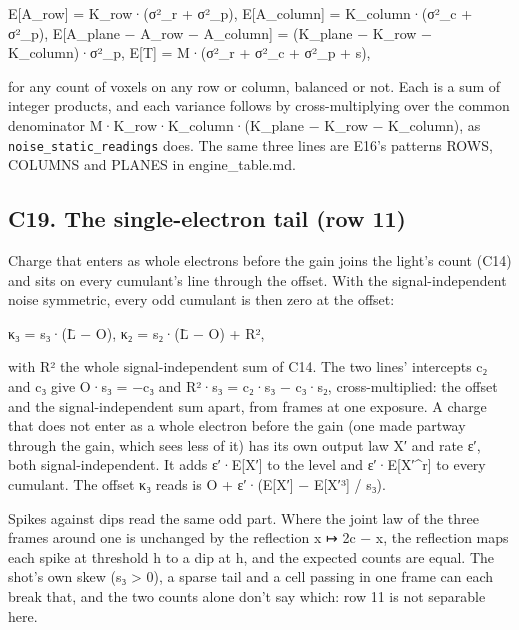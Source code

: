 E[A\_\allowbreak{}row] = K\_\allowbreak{}row·(σ²\_\allowbreak{}r + σ²\_\allowbreak{}p),  E[A\_\allowbreak{}column] = K\_\allowbreak{}column·(σ²\_\allowbreak{}c + σ²\_\allowbreak{}p), E[A\_\allowbreak{}plane − A\_\allowbreak{}row − A\_\allowbreak{}column] = (K\_\allowbreak{}plane − K\_\allowbreak{}row − K\_\allowbreak{}column)·σ²\_\allowbreak{}p,  E[T] = M·(σ²\_\allowbreak{}r + σ²\_\allowbreak{}c + σ²\_\allowbreak{}p + s),

for any count of voxels on any row or column, balanced or not. Each is a sum of integer products, and each variance follows by cross-multiplying over the common denominator M·K\_\allowbreak{}row·K\_\allowbreak{}column·(K\_\allowbreak{}plane − K\_\allowbreak{}row − K\_\allowbreak{}column), as \texttt{noise\_\allowbreak{}static\_\allowbreak{}readings} does. The same three lines are E16's patterns ROWS, COLUMNS and PLANES in engine\_\allowbreak{}table.md.

\subsection{\texorpdfstring{C19. The single-electron tail (row 11)}{C19. The single-electron tail (row 11)}}

Charge that enters as whole electrons before the gain joins the light's count (C14) and sits on every cumulant's line through the offset. With the signal-independent noise symmetric, every odd cumulant is then zero at the offset:

κ₃ = s₃·(L̄ − O),  κ₂ = s₂·(L̄ − O) + R²,

with R² the whole signal-independent sum of C14. The two lines' intercepts c₂ and c₃ give O·s₃ = −c₃ and R²·s₃ = c₂·s₃ − c₃·s₂, cross-multiplied: the offset and the signal-independent sum apart, from frames at one exposure. A charge that does not enter as a whole electron before the gain (one made partway through the gain, which sees less of it) has its own output law X′ and rate ε′, both signal-independent. It adds ε′·E[X′] to the level and ε′·E[X′\textasciicircum{}r] to every cumulant. The offset κ₃ reads is O + ε′·(E[X′] − E[X′³] / s₃).

Spikes against dips read the same odd part. Where the joint law of the three frames around one is unchanged by the reflection x ↦ 2c − x, the reflection maps each spike at threshold h to a dip at h, and the expected counts are equal. The shot's own skew (s₃ > 0), a sparse tail and a cell passing in one frame can each break that, and the two counts alone don't say which: row 11 is not separable here.


